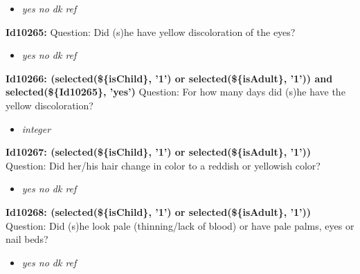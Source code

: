 \documentclass{article}%
\begin{document}
%
\begin{itemize}%
\item%
\textit{yes\newline%
 no\newline%
 dk\newline%
 ref\newline%
}%
\end{itemize}%
\textbf{Id10265: \newline%
}%
Question: Did (s)he have yellow discoloration of the eyes?\newline%
%
\begin{itemize}%
\item%
\textit{yes\newline%
 no\newline%
 dk\newline%
 ref\newline%
}%
\end{itemize}%
\textbf{Id10266: (selected(\$\{isChild\}, '1') or selected(\$\{isAdult\}, '1')) and selected(\$\{Id10265\}, 'yes')\newline%
}%
Question: For how many days did (s)he have the yellow discoloration?\newline%
%
\begin{itemize}%
\item%
\textit{integer\newline%
}%
\end{itemize}%
\textbf{Id10267: (selected(\$\{isChild\}, '1') or selected(\$\{isAdult\}, '1'))\newline%
}%
Question: Did her/his hair change in color to a reddish or yellowish color?\newline%
%
\begin{itemize}%
\item%
\textit{yes\newline%
 no\newline%
 dk\newline%
 ref\newline%
}%
\end{itemize}%
\textbf{Id10268: (selected(\$\{isChild\}, '1') or selected(\$\{isAdult\}, '1'))\newline%
}%
Question: Did (s)he look pale (thinning/lack of blood) or have pale palms, eyes or nail beds?\newline%
%
\begin{itemize}%
\item%
\textit{yes\newline%
 no\newline%
 dk\newline%
 ref\newline%
}%
\end{itemize}%
\end{document}
